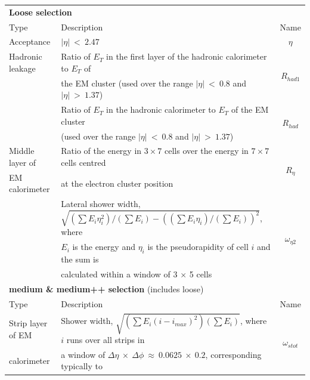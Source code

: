 	\begin {table}[h!]
	\begin{center}
  	\begin{tabular}{llc}
		\hline
		\multicolumn{3}{l}{{\bf Loose selection}} 																					\\ 
		Type 				& Description																	& Name 					\\
		\hline
\rule{0pt}{3ex}Acceptance 			& $|\eta|~<~2.47$ 														& $\eta$				\\
\rule{0pt}{4ex}Hadronic leakage	& Ratio of $E_{T}$ in the first layer of the hadronic calorimeter to $E_{T}$ of	& \multirow{2}{*}{$R_{had1}$}			\\
							& the EM cluster (used over the range $|\eta|~<~0.8$ and $|\eta|~>~1.37$)		&						\\
							\rule{0pt}{3ex} 
							& Ratio of $E_{T}$ in the hadronic calorimeter to $E_{T}$ of the EM cluster 	& \multirow{2}{*}{$R_{had}$}			\\
							& (used over the range $|\eta|~<~0.8$ and $|\eta|~>~1.37$)						&						\\
\rule{0pt}{4ex}Middle layer of  	& Ratio of the energy in $3\times7$ cells over the energy in $7\times7$ cells centred  	& \multirow{2}{*}{$R_{\eta}$}	\\
		EM calorimeter		& at the electron cluster position												&						\\
							\rule{0pt}{3ex} 
							& Lateral shower width, $\sqrt{(\sum{E_{i} \eta_{i}^{2}})/(\sum{E_{i}}) - ((\sum{E_{i} \eta_{i}})/(\sum{E_{i}}))^{2}}$, where  	& \multirow{3}{*}{$\omega_{\eta2}$}		\\
							& $E_{i}$ is the energy and $\eta_{i}$ is the pseudorapidity of cell $i$ and the sum is 	& 			\\
							& calculated  within a window of 3 $\times$ 5 cells								&						\\
		\hline
		\hline
		\multicolumn{3}{l}{{\bf medium \& medium++ selection} (includes loose)}																	\\
		Type 				& Description																	& Name 		 			\\
		\hline
\rule{0pt}{3ex}Strip layer of EM 	& Shower width, $\sqrt{(\sum{E_{i}(i - i_{max})^{2}})(\sum{E_{i}})}$, where $i$ runs over all strips in & \multirow{3}{*}{$\omega_{stot}$}	\\
		calorimeter 		& a window of $\Delta\eta~\times~\Delta\phi~\approx~0.0625~\times~0.2$, corresponding typically to  	&			\\

\end{tabular}
\end{center}
\end{table}
